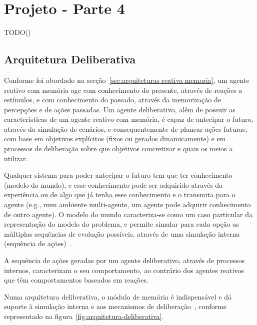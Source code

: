 \chapter{Projeto - Parte 4}\label{ch:projeto-parte4}

TODO()


\section{Arquitetura Deliberativa}\label{sec:arquitetura-deliberativa}

Conforme foi abordado na secção~\ref{sec:arquiteturas-reativa-memoria}, um agente reativo com memória age com conhecimento do presente, através de reações a estímulos, e com conhecimento do passado, através da memorização de percepções e de ações passadas.
Um agente deliberativo, além de possuir as características de um agente reativo com memória, é capaz de antecipar o futuro, através da simulação de cenários, e consequentemente de planear ações futuras, com base em objetivos explícitos (fixos ou gerados dinamicamente) e em processos de deliberação sobre que objetivos concretizar e quais os meios a utilizar.

Qualquer sistema para poder antecipar o futuro tem que ter conhecimento (modelo do mundo), e esse conhecimento pode ser adquirido através da experiência ou de algo que já tenha esse conhecimento e o transmita para o agente (e.g., num ambiente multi-agente, um agente pode adquirir conhecimento de outro agente).
O modelo do mundo caracteriza-se como um caso particular da representação do modelo do problema, e permite simular para cada opção as múltiplas sequências de evolução possíveis, através de uma simulação interna (sequência de ações)~\cite{isel:iasa:slides:arq-agentes-deliberativos}.

A sequência de ações geradas por um agente deliberativo, através de processos internos, caracterizam o seu comportamento, ao contrário dos agentes reativos que têm comportamentos baseados em reações.

Numa arquitetura deliberativa, o módulo de memória é indispensável e dá suporte à simulação interna e aos mecanismos de deliberação~\cite{isel:iasa:slides:arq-agentes-deliberativos}, conforme representado na figura~\ref{fig:arquitetura-deliberativa}.

